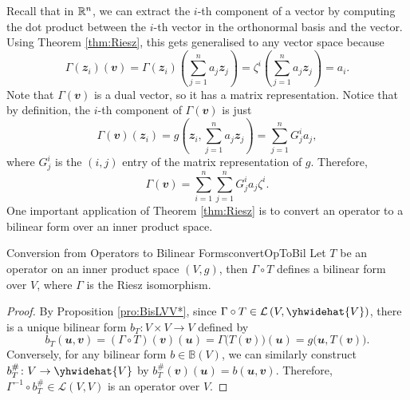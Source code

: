 \documentclass[math, code]{amznotes}
\theoremstyle{remark}
\begin{document}
    Recall that in $\mathbb{R}^n$, we can extract the $i$-th component of a vector by computing the dot product between the $i$-th vector in the orthonormal basis and the vector. Using Theorem \ref{thm:Riesz}, this gets generalised to any vector space because 
    \begin{equation*}
        \Gamma(\mathbfit{z}_i)(\mathbfit{v}) = \Gamma(\mathbfit{z}_i)\left(\sum_{j = 1}^{n}a_j\mathbfit{z}_j\right) = \zeta^i\left(\sum_{j = 1}^{n}a_j\mathbfit{z}_j\right) = a_i.
    \end{equation*}
    Note that $\Gamma(\mathbfit{v})$ is a dual vector, so it has a matrix representation. Notice that by definition, the $i$-th component of $\Gamma(\mathbfit{v})$ is just 
    \begin{equation*}
        \Gamma(\mathbfit{v})(\mathbfit{z}_i) = g\left(\mathbfit{z}_i, \sum_{j = 1}^{n}a_j\mathbfit{z}_j\right) = \sum_{j = 1}^{n}G^i_ja_j,
    \end{equation*}
    where $G^i_j$ is the $(i, j)$ entry of the matrix representation of $g$. Therefore,
    \begin{equation*}
        \Gamma(\mathbfit{v}) = \sum_{i = 1}^{n}\sum_{j = 1}^{n}G^i_ja_j\zeta^i.
    \end{equation*}
    One important application of Theorem \ref{thm:Riesz} is to convert an operator to a bilinear form over an inner product space.
    \begin{probox}{Conversion from Operators to Bilinear Forms}{convertOpToBil}
        Let $T$ be an operator on an inner product space $(V, g)$, then $\Gamma \circ T$ defines a bilinear form over $V$, where $\Gamma$ is the Riesz isomorphism. 
        \tcblower
        \begin{proof}
            By Proposition \ref{pro:BisLVV*}, since $\Gamma \circ T \in \mathcal{L}\left(V, \yhwidehat{V}\right)$, there is a unique bilinear form $b_T \colon V \times V \to V$ defined by 
            \begin{equation*}
                b_T(\mathbfit{u}, \mathbfit{v}) = (\Gamma \circ T)(\mathbfit{v})(\mathbfit{u}) = \Gamma\bigl(T(\mathbfit{v})\bigr)(\mathbfit{u}) = g\bigl(\mathbfit{u}, T(\mathbfit{v})\bigr).
            \end{equation*}
            Conversely, for any bilinear form $b \in \mathbb{B}(V)$, we can similarly construct $b^{\#}_T \colon V \to \yhwidehat{V}$ by $b^{\#}_T(\mathbfit{v})(\mathbfit{u}) = b(\mathbfit{u}, \mathbfit{v})$. Therefore, $\Gamma^{-1} \circ b^{\#}_T \in \mathcal{L}(V, V)$ is an operator over $V$. 
        \end{proof}
    \end{probox}
\end{document}

